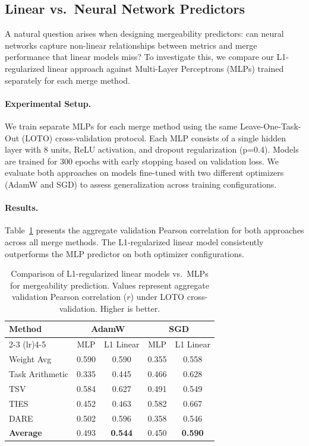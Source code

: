 
\subsection{Linear vs.\ Neural Network Predictors}
\label{sec:mlp_vs_l1}

A natural question arises when designing mergeability predictors: can neural networks capture non-linear relationships between metrics and merge performance that linear models miss? To investigate this, we compare our L1-regularized linear approach against Multi-Layer Perceptrons (MLPs) trained separately for each merge method.

\paragraph{Experimental Setup.}
We train separate MLPs for each merge method using the same Leave-One-Task-Out (LOTO) cross-validation protocol. Each MLP consists of a single hidden layer with 8 units, ReLU activation, and dropout regularization (p=0.4). Models are trained for 300 epochs with early stopping based on validation loss. We evaluate both approaches on models fine-tuned with two different optimizers (AdamW and SGD) to assess generalization across training configurations.

\paragraph{Results.}
Table~\ref{tab:mlp_vs_l1} presents the aggregate validation Pearson correlation for both approaches across all merge methods. The L1-regularized linear model consistently outperforms the MLP predictor on both optimizer configurations.

\begin{table}[h]
\centering
\caption{Comparison of L1-regularized linear models vs.\ MLPs for mergeability prediction. Values represent aggregate validation Pearson correlation ($r$) under LOTO cross-validation. Higher is better.}
\label{tab:mlp_vs_l1}
\begin{tabular}{lcccc}
\toprule
\multirow{2}{*}{\textbf{Method}} & \multicolumn{2}{c}{\textbf{AdamW}} & \multicolumn{2}{c}{\textbf{SGD}} \\
\cmidrule(lr){2-3} \cmidrule(lr){4-5}
 & MLP & L1 Linear & MLP & L1 Linear \\
\midrule
Weight Avg & 0.590 & 0.590 & 0.355 & 0.558 \\
Task Arithmetic & 0.335 & 0.445 & 0.466 & 0.628 \\
TSV & 0.584 & 0.627 & 0.491 & 0.549 \\
TIES & 0.452 & 0.463 & 0.582 & 0.667 \\
DARE & 0.502 & 0.596 & 0.358 & 0.546 \\
\midrule
\textbf{Average} & 0.493 & \textbf{0.544} & 0.450 & \textbf{0.590} \\
\bottomrule
\end{tabular}
\end{table}

